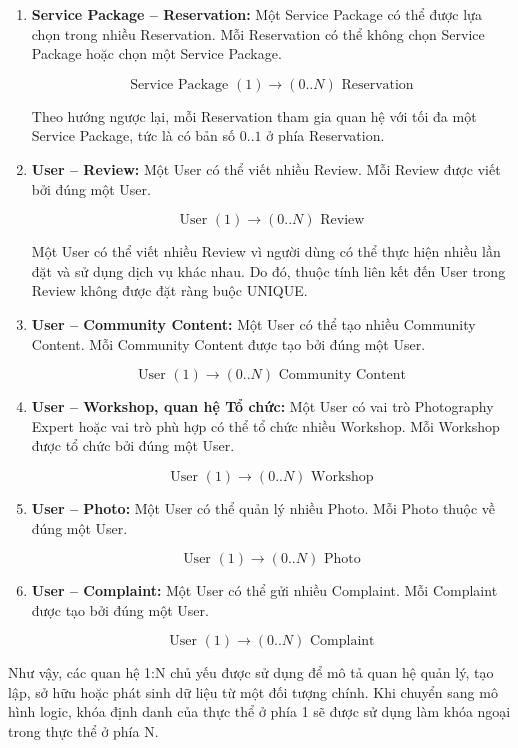 \begin{enumerate}
\[
\text{User } (1) \longrightarrow (0..N) \text{ Reservation}
\]

\item \textbf{Service Package -- Reservation:} Một Service Package có thể được lựa chọn trong nhiều Reservation. Mỗi Reservation có thể không chọn Service Package hoặc chọn một Service Package.

\[
\text{Service Package } (1) \longrightarrow (0..N) \text{ Reservation}
\]

Theo hướng ngược lại, mỗi Reservation tham gia quan hệ với tối đa một Service Package, tức là có bản số $0..1$ ở phía Reservation.

\item \textbf{User -- Review:} Một User có thể viết nhiều Review. Mỗi Review được viết bởi đúng một User.

\[
\text{User } (1) \longrightarrow (0..N) \text{ Review}
\]

Một User có thể viết nhiều Review vì người dùng có thể thực hiện nhiều lần đặt và sử dụng dịch vụ khác nhau. Do đó, thuộc tính liên kết đến User trong Review không được đặt ràng buộc UNIQUE.

\item \textbf{User -- Community Content:} Một User có thể tạo nhiều Community Content. Mỗi Community Content được tạo bởi đúng một User.

\[
\text{User } (1) \longrightarrow (0..N) \text{ Community Content}
\]

\item \textbf{User -- Workshop, quan hệ Tổ chức:} Một User có vai trò Photography Expert hoặc vai trò phù hợp có thể tổ chức nhiều Workshop. Mỗi Workshop được tổ chức bởi đúng một User.

\[
\text{User } (1) \longrightarrow (0..N) \text{ Workshop}
\]

\item \textbf{User -- Photo:} Một User có thể quản lý nhiều Photo. Mỗi Photo thuộc về đúng một User.

\[
\text{User } (1) \longrightarrow (0..N) \text{ Photo}
\]

\item \textbf{User -- Complaint:} Một User có thể gửi nhiều Complaint. Mỗi Complaint được tạo bởi đúng một User.

\[
\text{User } (1) \longrightarrow (0..N) \text{ Complaint}
\]

\end{enumerate}

Như vậy, các quan hệ 1:N chủ yếu được sử dụng để mô tả quan hệ quản lý, tạo lập, sở hữu hoặc phát sinh dữ liệu từ một đối tượng chính. Khi chuyển sang mô hình logic, khóa định danh của thực thể ở phía 1 sẽ được sử dụng làm khóa ngoại trong thực thể ở phía N.

